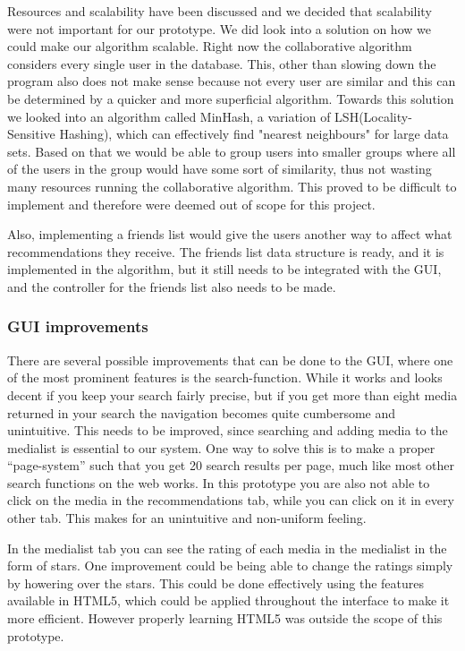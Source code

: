 Resources and scalability have been discussed and we decided that scalability were not important for our prototype. We did look into a solution on how we could make our algorithm scalable. Right now the collaborative algorithm considers every single user in the database. This, other than slowing down the program also does not make sense because not every user are similar and this can be determined by a quicker and more superficial algorithm. Towards this solution we looked into an algorithm called MinHash, a variation of LSH(Locality-Sensitive Hashing), which can effectively find "nearest neighbours" for large data sets. Based on that we would be able to group users into smaller groups where all of the users in the group would have some sort of similarity, thus not wasting many resources running the collaborative algorithm. This proved to be difficult to implement and therefore were deemed out of scope for this project.

Also, implementing a friends list would give the users another way to affect what recommendations they receive. The friends list data structure is ready, and it is implemented in the algorithm, but it still needs to be integrated with the GUI, and the controller for the friends list also needs to be made.

\subsubsection{GUI improvements}
There are several possible improvements that can be done to the GUI, where one of the most prominent features is the search-function. While it works and looks decent if you keep your search fairly precise, but if you get more than eight media returned in your search the navigation becomes quite cumbersome and unintuitive. This needs to be improved, since searching and adding media to the medialist is essential to our system. One way to solve this is to make a proper “page-system” such that you get 20 search results per page, much like most other search functions on the web works.
In this prototype you are also not able to click on the media in the recommendations tab, while you can click on it in every other tab. This makes for an unintuitive and non-uniform feeling.

In the medialist tab you can see the rating of each media in the medialist in the form of stars. One improvement could be being able to change the ratings simply by howering over the stars. This could be done effectively using the features available in HTML5, which could be applied throughout the interface to make it more efficient. However properly learning HTML5 was outside the scope of this prototype.

